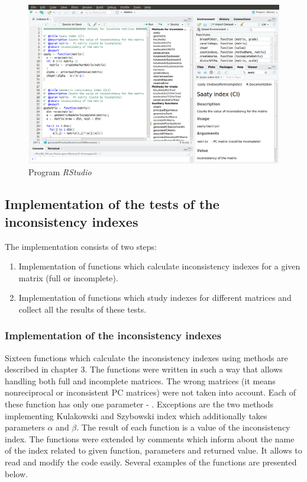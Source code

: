 \begin{figure}[h]
\centerline{\includegraphics[width=\textwidth]{images/rstudio.png}}
\caption{Program \textit{RStudio}}
\label{fig:rstudio}
\end{figure}

\subsection{Implementation of the tests of the inconsistency indexes}
The implementation consists of two steps:
\begin{enumerate}
  \item Implementation of functions which calculate inconsistency indexes for a given matrix (full or incomplete).
  \item Implementation of functions which study indexes for different matrices and collect all the results of these tests. 
\end{enumerate}

\subsubsection{Implementation of the inconsistency indexes}
Sixteen functions which calculate the inconsistency indexes using methods are described in chapter 3. The functions were written in such a way that allows handling both full and incomplete matrices. The wrong matrices (it means nonreciprocal or inconsistent PC matrices) were not taken into account. Each of these function has only one parameter - . Exceptions are the two methods implementing Kulakowski and Szybowski index which additionally takes parameters $\alpha$ and $\beta$. The result of each function is a value of the inconsistency index. The functions were extended by comments which inform about the name of the index related to given function, parameters and returned value. It allows to read and modify the code easily. Several examples of the functions are presented below.

